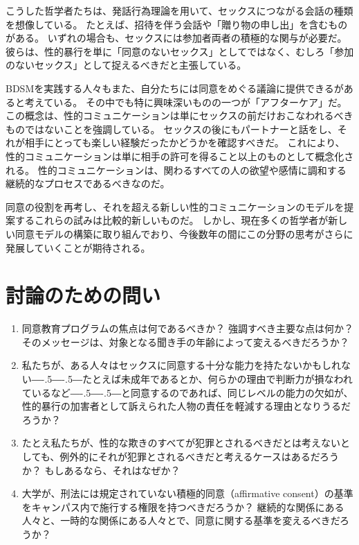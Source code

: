 \documentclass[paper=a4,book,openany]{jlreq}
\def\DDASH{―\kern-.5\zw―\kern-.5\zw―} %
\begin{document}
こうした哲学者たちは、発話行為理論を用いて、セックスにつながる会話の種類を想像している。
たとえば、招待を伴う会話や「贈り物の申し出」を含むものがある\citep[p.74]{kukla18:_thats_what_she_said}。
いずれの場合も、セックスには参加者両者の積極的な関与が必要だ。
彼らは、性的暴行を単に「同意のないセックス」としてではなく、むしろ「参加のないセックス」として捉えるべきだと主張している。

BDSMを実践する人々もまた、自分たちには同意をめぐる議論に提供できるがあると考えている。
その中でも特に興味深いものの一つが「アフターケア」だ。
この概念は、性的コミュニケーションは単にセックスの前だけおこなわれるべきものではないことを強調している。
セックスの後にもパートナーと話をし、それが相手にとっても楽しい経験だったかどうかを確認すべきだ。
これにより、性的コミュニケーションは単に相手の許可を得ること以上のものとして概念化される。
性的コミュニケーションは、関わるすべての人の欲望や感情に調和する継続的なプロセスであるべきなのだ。

同意の役割を再考し、それを超える新しい性的コミュニケーションのモデルを提案するこれらの試みは比較的新しいものだ。
しかし、現在多くの哲学者が新しい同意モデルの構築に取り組んでおり、今後数年の間にこの分野の思考がさらに発展していくことが期待される。

\section{討論のための問い}

\begin{enumerate}

\item 同意教育プログラムの焦点は何であるべきか？ 強調すべき主要な点は何か？ そのメッセージは、対象となる聞き手の年齢によって変えるべきだろうか？

\item  私たちが、ある人々はセックスに同意する十分な能力を持たないかもしれない{\DDASH}たとえば未成年であるとか、何らかの理由で判断力が損なわれているなど{\DDASH}と同意するのであれば、同じレベルの能力の欠如が、性的暴行の加害者として訴えられた人物の責任を軽減する理由となりうるだろうか？

\item  たとえ私たちが、性的な欺きのすべてが犯罪とされるべきだとは考えないとしても、例外的にそれが犯罪とされるべきだと考えるケースはあるだろうか？ もしあるなら、それはなぜか？

\item  大学が、刑法には規定されていない積極的同意（affirmative consent）の基準をキャンパス内で施行する権限を持つべきだろうか？ 継続的な関係にある人々と、一時的な関係にある人々とで、同意に関する基準を変えるべきだろうか？
\end{enumerate}
\end{document}
